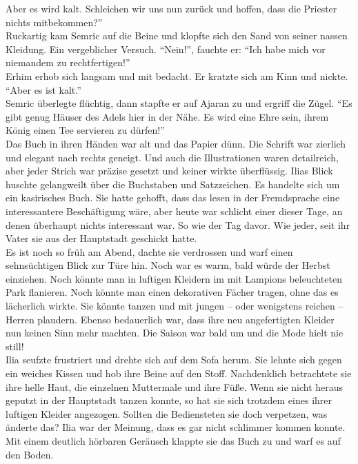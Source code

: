 Aber es wird kalt. Schleichen wir uns nun zurück und hoffen, dass die Priester nichts 
mitbekommen?''\\
Ruckartig kam Semric auf die Beine und klopfte sich den Sand von seiner nassen Kleidung. Ein 
vergeblicher Versuch. ``Nein!'', fauchte er: ``Ich habe mich vor niemandem zu rechtfertigen!''\\
Erhim erhob sich langsam und mit bedacht. Er kratzte sich am Kinn und nickte. ``Aber es ist 
kalt.''\\
Semric überlegte flüchtig, dann stapfte er auf Ajaran zu und ergriff die Zügel. ``Es gibt genug 
Häuser des Adels hier in der Nähe. Es wird eine Ehre sein, ihrem König einen Tee servieren zu 
dürfen!''\\

Das Buch in ihren Händen war alt und das Papier dünn. Die Schrift war zierlich und elegant nach 
rechts geneigt. Und auch die Illustrationen waren detailreich, aber jeder Strich war präzise gesetzt 
und keiner wirkte überflüssig. Ilias Blick huschte gelangweilt über die Buchstaben und Satzzeichen. 
Es handelte sich um ein kasirisches Buch. Sie hatte gehofft, dass das lesen in der Fremdsprache 
eine interessantere Beschäftigung wäre, aber heute war schlicht einer dieser Tage, an denen 
überhaupt nichts interessant war. So wie der Tag davor. Wie jeder, seit ihr Vater sie aus der 
Hauptstadt geschickt hatte. \\
Es ist noch so früh am Abend, dachte sie verdrossen und warf einen sehnsüchtigen Blick zur Türe hin. 
Noch war es warm, bald würde der Herbst einziehen. Noch könnte man in luftigen Kleidern im mit 
Lampions beleuchteten Park flanieren. Noch könnte man einen dekorativen Fächer tragen, ohne das es 
lächerlich wirkte. Sie könnte tanzen und mit jungen – oder wenigstens reichen – Herren plaudern. 
Ebenso bedauerlich war, dass ihre neu angefertigten Kleider nun keinen Sinn mehr machten. Die Saison 
war bald um und die Mode hielt nie still! \\
Ilia seufzte frustriert und drehte sich auf dem Sofa herum. Sie lehnte sich gegen ein weiches Kissen 
und hob ihre Beine auf den Stoff. Nachdenklich betrachtete sie ihre helle Haut, die einzelnen 
Muttermale und ihre Füße. Wenn sie nicht heraus geputzt in der Hauptstadt tanzen konnte, so hat sie 
sich trotzdem eines ihrer luftigen Kleider angezogen. Sollten die Bediensteten sie doch verpetzen, 
was änderte das? Ilia war der Meinung, dass es gar nicht schlimmer kommen konnte. \\
Mit einem deutlich hörbaren Geräusch klappte sie das Buch zu und warf es auf den Boden. \\
